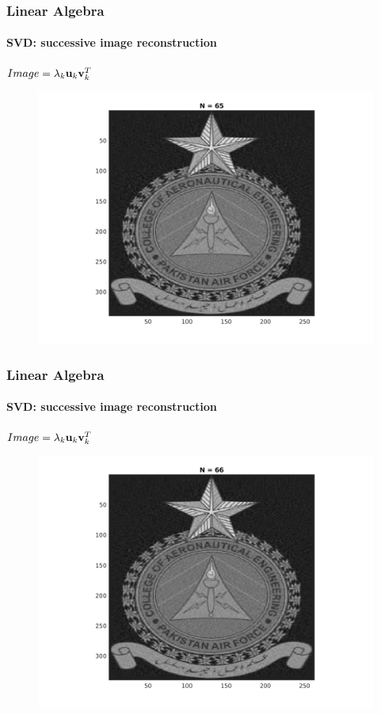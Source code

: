 \documentclass[hyperref={pdfpagelabels=true}]{beamer}
\begin{document}
\begin{frame}
\frametitle{Linear Algebra}
\framesubtitle{SVD: successive image reconstruction} 
\small{
\begin{center}
$Image = \lambda_k{\bf u}_k {\bf v}_k^T$
\end{center}}
\begin{figure}[!htb]
\centering
\includegraphics [scale=0.48]{n/b65.png}
\end{figure}
\end{frame}

\begin{frame}
\frametitle{Linear Algebra}
\framesubtitle{SVD: successive image reconstruction} 
\small{
\begin{center}
$Image = \lambda_k{\bf u}_k {\bf v}_k^T$
\end{center}}
\begin{figure}[!htb]
\centering
\includegraphics [scale=0.48]{n/b66.png}
\end{figure}
\end{frame}
\end{document}
